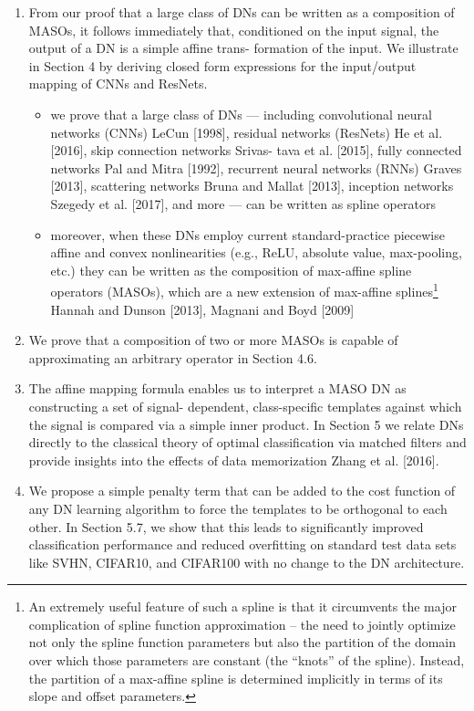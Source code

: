 \documentclass{article}
\begin{document}
\begin{enumerate}
	\item From our proof that a large class of DNs can be written as a composition of MASOs, it follows immediately that, conditioned on the input signal, the output of a DN is a simple affine trans- formation of the input. We illustrate in Section 4 by deriving closed form expressions for the input/output mapping of CNNs and ResNets.
		\begin{itemize}
		\item we prove that a large class of DNs — including convolutional neural networks (CNNs) LeCun [1998], residual networks (ResNets) He et al. [2016], skip connection networks Srivas- tava et al. [2015], fully connected networks Pal and Mitra [1992], recurrent neural networks (RNNs) Graves [2013], scattering networks Bruna and Mallat [2013], inception networks Szegedy et al. [2017], and more — can be written as spline operators
		\item moreover, when these DNs employ current standard-practice piecewise affine and convex nonlinearities (e.g., ReLU, absolute value, max-pooling, etc.) they can be written as the composition of max-affine spline operators (MASOs), which are a new extension of max-affine splines\footnote{An extremely useful feature of such a spline is that it circumvents the major complication of spline function approximation – the need to jointly optimize not only the spline function parameters but also the partition of the domain over which those parameters are constant (the “knots” of the spline). Instead, the partition of a max-affine spline is determined implicitly in terms of its slope and offset parameters.} Hannah and Dunson [2013], Magnani and Boyd [2009]
	\end{itemize}
	\item We prove that a composition of two or more MASOs is capable of approximating an arbitrary operator in Section 4.6.
	\item The affine mapping formula enables us to interpret a MASO DN as constructing a set of signal- dependent, class-specific templates against which the signal is compared via a simple inner product. In Section 5 we relate DNs directly to the classical theory of optimal classification via matched filters and provide insights into the effects of data memorization Zhang et al. [2016].
	\item We propose a simple penalty term that can be added to the cost function of any DN learning algorithm to force the templates to be orthogonal to each other. In Section 5.7, we show that this leads to significantly improved classification performance and reduced overfitting on standard test data sets like SVHN, CIFAR10, and CIFAR100 with no change to the DN architecture.

\end{enumerate}
\end{document}
